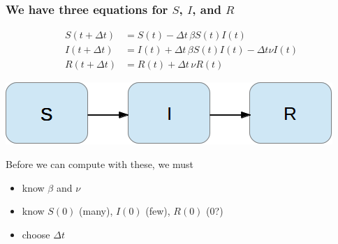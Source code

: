 \documentclass{beamer}
\begin{document}
\begin{frame}
\frametitle{We have three equations for $S$, $I$, and $R$}

\begin{align}
S(t+\Delta t) &= S(t) - \Delta t\,\beta S(t)I(t)
\label{SIR1:S}\\
I(t+\Delta t) &= I(t) + \Delta t\,\beta S(t)I(t) -\Delta t\nu I(t)
\label{SIR1:I}\\
R(t+\Delta t) &= R(t) + \Delta t\,\nu R(t)
\label{SIR1:R}
\end{align}


\begin{center}  %
  \centerline{\includegraphics[width=0.7\linewidth]{fig/categories_SIR.png}}
\end{center}


Before we can compute with these, we must

\begin{itemize}
 \item know $\beta$ and $\nu$

 \item know $S(0)$ (many), $I(0)$ (few), $R(0)$ (0?)

 \item choose $\Delta t$
\end{itemize}

\noindent
\end{frame}
\end{document}
